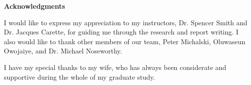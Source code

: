 \begin{center}
\textbf{\textup{\Large Acknowledgments}}
\end{center}

I would like to express my appreciation to my instructors, Dr. Spencer Smith and Dr. Jacques Carette, for guiding me through the research and report writing. I also would like to thank other members of our team, Peter Michalski, Oluwaseun Owojaiye, and Dr. Michael Noseworthy.

I have my special thanks to my wife, who has always been considerate and supportive during the whole of my graduate study.
